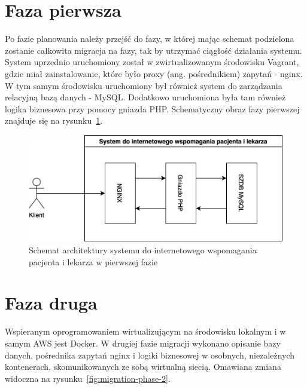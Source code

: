\documentclass[12pt,oneside]{book}
\newcommand{\captionvspace}{\vspace{6pt}}
\begin{document}
    \section{Faza pierwsza}
    Po fazie planowania należy przejść do fazy, w której mając schemat podzielona zostanie całkowita migracja na fazy, tak by utrzymać ciągłość działania systemu. System uprzednio uruchomiony został w zwirtualizowanym środowisku Vagrant, gdzie miał zainstalowanie, które było proxy (ang. pośrednikiem) zapytań - nginx. W tym samym środowisku uruchomiony był również system do zarządzania relacyjną bazą danych - MySQL. Dodatkowo uruchomiona była tam również logika biznesowa przy pomocy gniazda PHP. Schematyczny obraz fazy pierwszej znajduje się na rysunku~\ref{fig:migration-phase-1}.

    \begin{figure}[ht]
        \centering
        \includegraphics[width=\textwidth]{includes/images/migration-phase-1.png}
        \captionvspace
        \caption{Schemat architektury systemu do internetowego wspomagania pacjenta i lekarza w pierwszej fazie}
        \label{fig:migration-phase-1}
    \end{figure}


    \section{Faza druga}
    Wspieranym oprogramowaniem wirtualizującym na środowisku lokalnym i w samym AWS jest Docker. W drugiej fazie migracji wykonano opisanie bazy danych, pośrednika zapytań nginx i logiki biznesowej w osobnych, niezależnych kontenerach, skomunikowanych ze sobą wirtualną siecią. Omawiana zmiana widoczna na rysunku~\ref{fig:migration-phase-2}.
\end{document}
